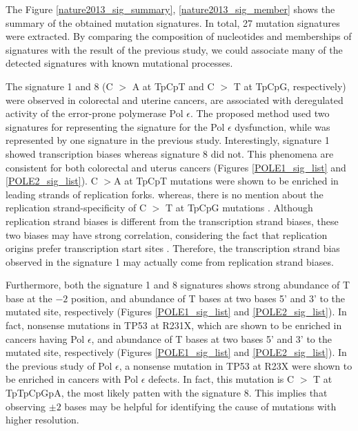 The Figure \ref{nature2013_sig_summary},  \ref{nature2013_sig_member} shows the summary of the obtained mutation signatures.
In total, 27 mutation signatures were extracted.
By comparing the composition of nucleotides and memberships of signatures with the result of the previous study,
we could associate many of the detected signatures with known mutational processes.



The signature 1 and 8 (C $>$ A at TpCpT and C $>$ T at TpCpG, respectively) were observed in colorectal and uterine cancers,
are associated with deregulated activity of the error-prone polymerase Pol $\epsilon$.
The proposed method used two signatures for representing the signature for the Pol $\epsilon$ dysfunction, 
while was represented by one signature in the previous study.
Interestingly, signature 1 showed transcription biases whereas signature 8 did not.
This phenomena are consistent for both colorectal and uterus cancers (Figures \ref{POLE1_sig_list} and \ref{POLE2_sig_list}).
C $>$A at TpCpT mutations were shown to be enriched in leading strands of replication forks.
whereas, there is no mention about the replication strand-specificity of C $>$ T at TpCpG mutations \cite{pmid25228659}.
Although replication strand biases is different from the transcription strand biases, these two biases may have strong correlation,
considering the fact that replication origins prefer transcription start sites \cite{pmid23187890}.
Therefore, the transcription strand bias observed in the signature 1 may actually come from replication strand biases.

Furthermore, both the signature 1 and 8 signatures shows strong abundance of T base at the $-2$ position,
and abundance of T bases at two bases 5' and 3' to the mutated site, respectively (Figures \ref{POLE1_sig_list} and \ref{POLE2_sig_list}).
In fact, nonsense mutations in TP53 at R231X, which are shown to be enriched in cancers having Pol $\epsilon$,
and abundance of T bases at two bases 5' and 3' to the mutated site, respectively (Figures \ref{POLE1_sig_list} and \ref{POLE2_sig_list}).
In the previous study of Pol $\epsilon$, a nonsense mutation in TP53 at R23X were shown to be enriched in cancers with Pol $\epsilon$ defects.
In fact, this mutation is C $>$ T at TpTpCpGpA, the most likely patten with the signature 8.
This implies that observing $\pm 2$ bases may be helpful for identifying the cause of mutations with higher resolution.


